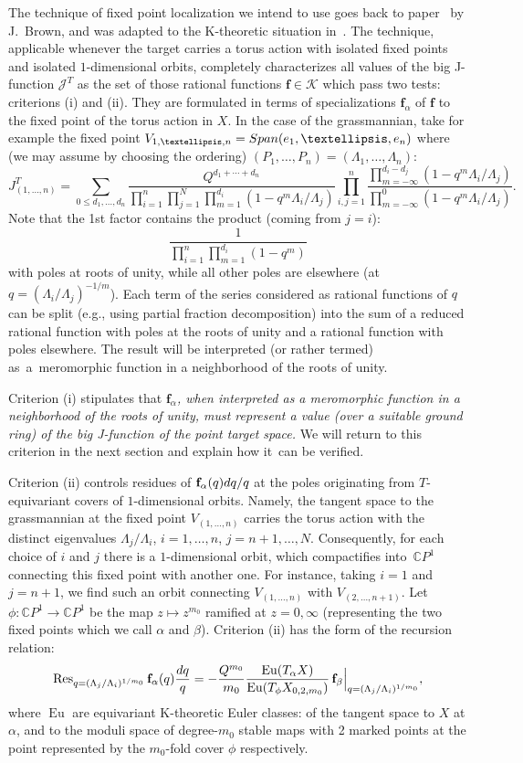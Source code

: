 \documentclass[11pt]{article}
\numberwithin{equation}{section}
\numberwithin{equation}{section}
\def\K{\mathcal K}
\def\J{\mathcal J}
\def\CC{\mathbb C}
\def\Res{\operatorname{Res}}
\def\a{\alpha}
\def\b{\beta}
\def\f{{\mathbf f}}
\def\Eu{\operatorname{Eu}}
\begin{document}
The technique of fixed point localization we intend to use goes back to paper~\cite{Jeff_Brown} by
J.~Brown, and was adapted to the K-theoretic situation in~\cite{Givental:perm2}. The technique, applicable whenever the target carries a torus action with isolated fixed points and isolated $1$-dimensional orbits, completely characterizes all values of the big J-function $\J^T$ as the set of those rational functions $\f\in \K$ which pass two tests: criterions (i) and (ii). They are formulated in terms of specializations $\f_{\a}$ of $\f$ to the fixed point of the torus action in $X$. In the case of the grassmannian, take for example the fixed point $V_{1,\dots,n}=\mathop{\rm Span}(e_1,\dots,e_n)$ where (we may assume by choosing the ordering) $(P_1,\dots,P_n)=(\Lambda_1,\dots,\Lambda_n)$:
\[
J^T_{(1,\dots,n)}= \sum_{0\leq d_1,\dots,d_n} \frac{Q^{d_1+\cdots+d_n}}{\prod_{i=1}^n\prod_{j=1}^N\prod_{m=1}^{d_i}(1-q^m\Lambda_i/\Lambda_j)} \prod_{i,j=1}^n\frac{\prod_{m=-\infty}^{d_i-d_j}(1-q^m\Lambda_i/\Lambda_j)} {\prod_{m=-\infty}^0(1-q^m\Lambda_i/\Lambda_j)}.
\]
Note that the 1st factor contains the product (coming from $j=i$):
\[
\frac{1}{\prod_{i=1}^n \prod_{m=1}^{d_i}(1-q^m)}
\]
with poles at roots of unity, while all other poles are elsewhere (at $q=(\Lambda_i/\Lambda_j)^{-1/m}$). Each term of the series considered as rational functions of $q$ can be split (e.g., using partial fraction decomposition) into the sum of a reduced rational function with poles at the roots of unity and a rational function with poles elsewhere. The result will be interpreted (or rather termed) as~a~mero\-mor\-phic function in a neighborhood of the roots of unity.

Criterion (i) stipulates that {\em $\f_\a$, when interpreted as a meromorphic function in a neighborhood of the roots of unity, must represent a value (over a suitable ground ring) of the big J-function of the point target space.} We will return to this criterion in the next section and explain how it~can be verified.

Criterion (ii) controls residues of $\f_\a(q){\rm d}q/q$ at the poles originating from $T$-equivariant covers of $1$-dimensional orbits. Namely, the tangent space to the grassmannian at the fixed point $V_{(1,\dots,n)}$ carries the torus action with the distinct eigenvalues $\Lambda_j/\Lambda_i$, $i=1,\dots,n$, $j=n+1,\dots,N$. Consequently, for each choice of $i$ and $j$ there is a $1$-dimensional orbit, which
compactifies into~$\CC P^1$ connecting this fixed point with another one. For instance, taking $i=1$ and $j=n+1$, we find such an orbit connecting $V_{(1,\dots,n)}$ with $V_{(2,\dots,n+1)}$. Let $\phi\colon \CC P^1\to \CC P^1$ be the map $z\mapsto z^{m_0}$ ramified at $z=0,\infty$ (representing the two fixed points which we call $\a$ and $\b$). Criterion (ii) has the form of the recursion relation:
\[
\Res_{q=(\Lambda_j/\Lambda_i)^{1/m_0}}\f_\a(q) \frac{{\rm d}q}{q} = -\frac{Q^{m_0}}{m_0}
\frac{\Eu(T_\a X)}{\Eu(T_{\phi}X_{0,2,m_0})} \, \f_{\b}\Big|_{q=(\Lambda_j/\Lambda_i)^{1/m_0}},
\]
where $\Eu$ are equivariant K-theoretic Euler classes: of the tangent space to $X$ at $\a$, and to the moduli space of degree-$m_0$ stable maps with 2 marked points at the point represented by the $m_0$-fold cover $\phi$ respectively.
\end{document}

